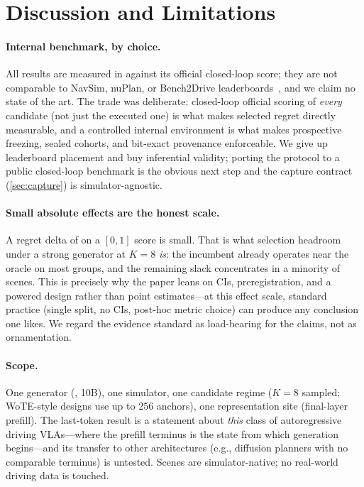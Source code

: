 \section{Discussion and Limitations}
\label{sec:discussion}

\paragraph{Internal benchmark, by choice.}
All results are measured in \simname{} against its official closed-loop score; they are not comparable to NavSim, nuPlan, or Bench2Drive leaderboards~\cite{dauner2024navsim,caesar2021nuplan,jia2024bench2drive}, and we claim no state of the art.
The trade was deliberate: closed-loop official scoring of \emph{every} candidate (not just the executed one) is what makes selected regret directly measurable, and a controlled internal environment is what makes prospective freezing, sealed cohorts, and bit-exact provenance enforceable.
We give up leaderboard placement and buy inferential validity; porting the protocol to a public closed-loop benchmark is the obvious next step and the capture contract (\cref{sec:capture}) is simulator-agnostic.

\paragraph{Small absolute effects are the honest scale.}
A regret delta of \MThreeKEightRegretMean{} on a $[0,1]$ score is small.
That is what selection headroom under a strong generator at $K{=}8$ \emph{is}: the incumbent already operates near the oracle on most groups, and the remaining slack concentrates in a minority of scenes.
This is precisely why the paper leans on CIs, preregistration, and a powered design rather than point estimates---at this effect scale, standard practice (single split, no CIs, post-hoc metric choice) can produce any conclusion one likes.
We regard the evidence standard as load-bearing for the claims, not as ornamentation.

\paragraph{Scope.}
One generator (\vlaname, 10B), one simulator, one candidate regime ($K{=}8$ sampled; WoTE-style designs use up to 256 anchors), one representation site (final-layer prefill).
The last-token result is a statement about \emph{this} class of autoregressive driving VLAs---where the prefill terminus is the state from which generation begins---and its transfer to other architectures (e.g., diffusion planners with no comparable terminus) is untested.
Scenes are simulator-native; no real-world driving data is touched.

